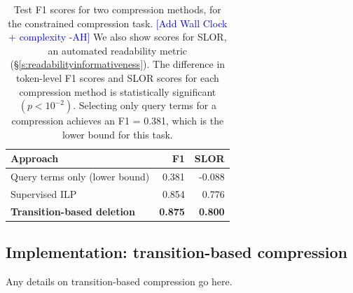 \documentclass[11pt,a4paper]{article}
\newcommand{\ahcomment}[1]{\textcolor{blue}{[#1 -AH]}}
\DeclareMathOperator*{\argmaxA}{arg\,max} %
\begin{document}
\begin{table}[]
\begin{tabular}{lrr}
\centering
Approach & F1 & SLOR  \\ \hline
Query terms only {\small (lower bound)} & 0.381 & -0.088 \\
Supervised ILP  &  0.854   &  0.776       \\
\textbf{Transition-based deletion} &  \textbf{0.875}  & \textbf{0.800}   \\
\end{tabular}
\caption{Test F1 scores for two compression methods, for the constrained compression task. \ahcomment{Add Wall Clock + complexity} We also show scores for SLOR, an automated readability metric (\S\ref{s:readabilityinformativeness}). The difference in token-level F1 scores and SLOR scores for each compression method is statistically significant {\small $(p < 10^{-2})$}. Selecting only query terms for a compression achieves an F1 = 0.381, which is the lower bound for this task.}
\label{t:results}
\end{table}


\subsection{Implementation: transition-based compression}\label{s:transition}

Any details on transition-based compression go here.



\end{document}
